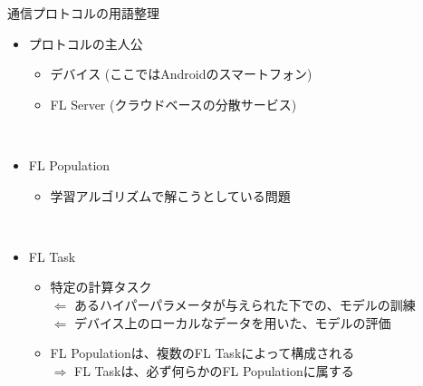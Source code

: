 \documentclass[dvipdfmx,notheorems,t]{beamer}
\begin{document}
\begin{frame}{通信プロトコルの用語整理}

\begin{itemize}
	\item プロトコルの主人公
	\begin{itemize}
		\item デバイス (ここではAndroidのスマートフォン)
		\item \alert{FL Server} (クラウドベースの分散サービス)
	\end{itemize} \
	
	\item \alert{FL Population}
	\begin{itemize}
		\item 学習アルゴリズムで解こうとしている問題
	\end{itemize} \
	
	\item \alert{FL Task}
	\begin{itemize}
		\item 特定の計算タスク \\
		$\Leftarrow$ あるハイパーパラメータが与えられた下での、モデルの訓練 \\
		$\Leftarrow$ デバイス上のローカルなデータを用いた、モデルの評価
		\newline
		\item FL Populationは、複数のFL Taskによって構成される \\
		$\Rightarrow$ FL Taskは、必ず何らかのFL Populationに属する
	\end{itemize}
\end{itemize}

\end{frame}
\end{document}
